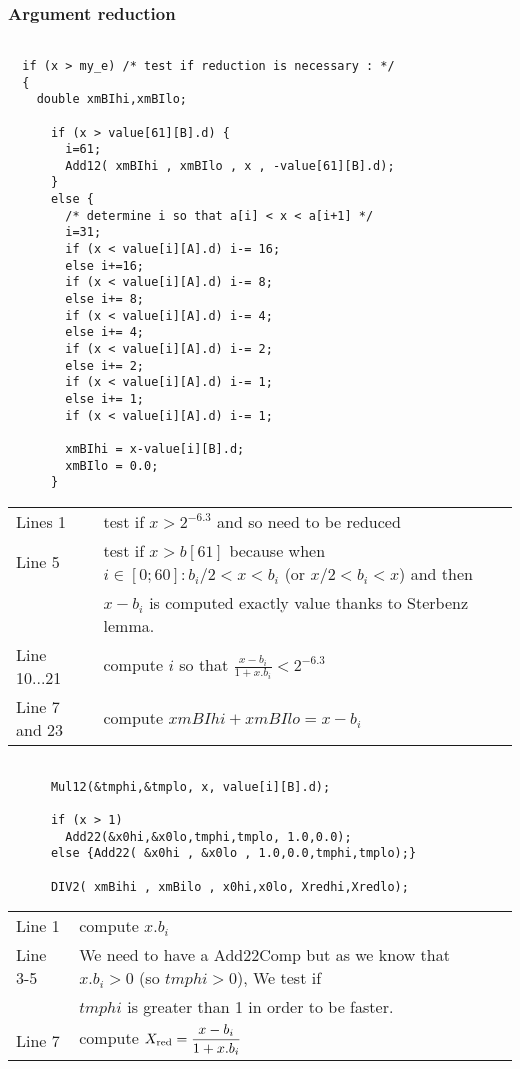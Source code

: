 \subsubsection{Argument reduction}
\begin{lstlisting}[caption={Reduction},firstnumber=1]

  if (x > my_e) /* test if reduction is necessary : */ 
  {
    double xmBIhi,xmBIlo;      

      if (x > value[61][B].d) {
        i=61;
        Add12( xmBIhi , xmBIlo , x , -value[61][B].d);
      }
      else {
        /* determine i so that a[i] < x < a[i+1] */
        i=31;
        if (x < value[i][A].d) i-= 16;
        else i+=16;
        if (x < value[i][A].d) i-= 8;
        else i+= 8;
        if (x < value[i][A].d) i-= 4;
        else i+= 4;
        if (x < value[i][A].d) i-= 2;
        else i+= 2;
        if (x < value[i][A].d) i-= 1;
        else i+= 1;
        if (x < value[i][A].d) i-= 1;
          
        xmBIhi = x-value[i][B].d;
        xmBIlo = 0.0;
      }
\end{lstlisting}

\begin{tabular}{ll}
Lines  1 & test if $x > 2^{-6.3}$ and so need to be reduced\\
Line 5 & test if $x>b[61]$ because when $i \in [0;60] : b_i/2 < x <
b_i$ (or $ x/2 < b_i < x$) and then \\&$x-b_i$ is computed exactly
value thanks to Sterbenz lemma.\\
Line 10...21 & compute $i$ so that $\frac{x-b_i}{1+x.b_i} < 2^{-6.3} $\\
Line 7 and 23 & compute $xmBIhi + xmBIlo = x - b_i$

\end{tabular}

\begin{lstlisting}[caption={Reduction : 2nd part},firstnumber=1]

      Mul12(&tmphi,&tmplo, x, value[i][B].d);

      if (x > 1)
        Add22(&x0hi,&x0lo,tmphi,tmplo, 1.0,0.0);
      else {Add22( &x0hi , &x0lo , 1.0,0.0,tmphi,tmplo);}

      DIV2( xmBihi , xmBilo , x0hi,x0lo, Xredhi,Xredlo);

\end{lstlisting}
\begin{tabular}{ll}
Line 1 & compute $x.b_i$\\
Line 3-5 & We need to have a Add22Comp but as we know that $x.b_i > 0$ (so
$tmphi>0$), We test if\\& $tmphi$ is greater than 1 in order to be
faster.\\
Line 7 & compute $X_{\mathrm{red}} = \dfrac{x-b_i}{1+x.b_i}$
\end{tabular}
\bigskip
